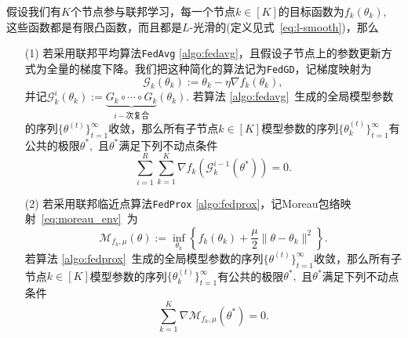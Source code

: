 \begin{theorem}
\label{thm:fedsplit-correctness}
假设我们有$K$个节点参与联邦学习，每一个节点$k \in [K]$的目标函数为$f_k(\theta_k),$ 这些函数都是有限凸函数，而且都是$L$-光滑的(定义见式~\eqref{eq:l-smooth})，那么
\begin{itemize}
\item[(1)] 若采用联邦平均算法\texttt{FedAvg} \ref{algo:fedavg}，且假设子节点上的参数更新方式为全量的梯度下降。我们把这种简化的算法记为\texttt{FedGD}，记梯度映射为
\begin{equation}
\label{eq:grad-mapping}
\mathcal{G}_k (\theta_k) := \theta_k - \eta \nabla f_k (\theta_k),
\end{equation}
并记$\mathcal{G}^i_k (\theta_k) := \underbrace{G_k\circ\cdots\circ G_k}_{i-\text{次复合}} (\theta_k).$ 若算法 \ref{algo:fedavg}~生成的全局模型参数的序列$\{ \theta^{(t)} \}_{t=1}^{\infty}$收敛，那么所有子节点$k \in [K]$模型参数的序列$\{ \theta_k^{(t)} \}_{t=1}^{\infty}$有公共的极限$\theta^*,$ 且$\theta^*$满足下列不动点条件
\begin{equation}
\label{eq:fedgd-fixed-pt}
\sum\limits_{i=1}^R \sum\limits_{k=1}^K \nabla f_k(\mathcal{G}_k^{i-1}(\theta^*)) = 0.
\end{equation}
\item[(2)] 若采用联邦临近点算法\texttt{FedProx} \ref{algo:fedprox}，记Moreau包络映射~\eqref{eq:moreau_env}~为
\begin{equation}
\label{eq:moreau-mapping}
\mathcal{M}_{f_k, \mu} (\theta) := \inf\limits_{\theta_k} \left\{ f_k(\theta_k) + \frac{\mu}{2} \lVert \theta - \theta_k \rVert^2 \right\}.
\end{equation}
若算法 \ref{algo:fedprox}~生成的全局模型参数的序列$\{ \theta^{(t)} \}_{t=1}^{\infty}$收敛，那么所有子节点$k \in [K]$模型参数的序列$\{ \theta_k^{(t)} \}_{t=1}^{\infty}$有公共的极限$\theta^*,$ 且$\theta^*$满足下列不动点条件
\begin{equation}
\label{eq:fedprox-fixed-pt}
\sum\limits_{k=1}^K \nabla \mathcal{M}_{f_k, \mu} (\theta^*) = 0.
\end{equation}
\end{itemize}
\end{theorem}

